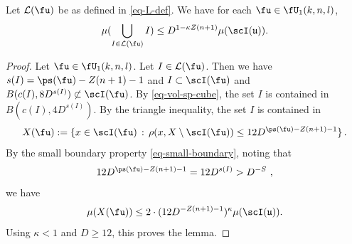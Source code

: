 \begin{lemma}
\label{boundary-exception}
\leanok
{}

Let $\mathcal{L}(\fu)$ be as defined in \eqref{eq-L-def}. We have for each $\fu\in \fU_1(k,n,l)$,
\begin{equation}
\mu(\bigcup_{I\in \mathcal{L}(\fu)} I)
\le D^{1-\kappa Z(n+1)}
        \mu(\scI(\mathfrak{u})).
\end{equation}
\end{lemma}
\begin{proof}
Let $\fu\in \fU_1(k,n,l)$.
Let $I \in \mathcal{L}(\fu)$. Then we have $s(I) = \ps(\fu) - Z(n+1) - 1$ and $I \subset \scI(\fu)$ and $B(c(I), 8D^{s(I)}) \not \subset \scI(\fu)$.
By \eqref{eq-vol-sp-cube}, the set $I$
is contained in $B(c(I), 4D^{s(I)})$.
By the triangle inequality, the set $I$
is contained in
\begin{equation}
    X(\fu):=\{x \in \scI(\fu) \, : \, \rho(x, X \setminus \scI(\fu)) \leq 12 D^{\ps(\fu) - Z(n+1)-1}\}\,.
\end{equation}
 By the small boundary property \eqref{eq-small-boundary}, noting that
 \begin{equation*}
     12D^{\ps(\fu) - Z(n+1) - 1} = 12D^{s(I)} > D^{-S}\ ,
 \end{equation*} we have
   $$
        \mu(X(\fu)) \le
        2\cdot(12 D^{-Z(n+1)-1})^\kappa
        \mu(\scI(\mathfrak{u})).
    $$
Using $\kappa<1$ and $D \ge 12$, this proves the lemma.
\end{proof}

